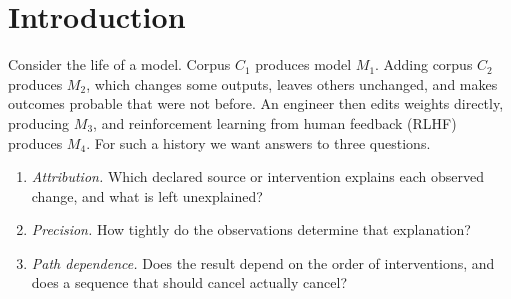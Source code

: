 \documentclass[11pt]{article}
\theoremstyle{definition}
\theoremstyle{remark}
\begin{document}
\begin{abstract}
1-cells differ. Their vertical composition is the gluing lemma and is strictly associative, but the
natural whiskerings are not functorial, and the strict 2-categorical structure is a graded metric
shadow. For several contexts, two compatible contexts always glue, and that gluing is vertical
composition of witnesses. For a general cover, the contextual fraction of Abramsky, Barbosa and
Mansfield equals our minimal unmodeled weight, and the best approximate global state is computed by a
linear program; for the Popescu--Rohrlich box it is exactly $1/4$ away from some context. Gluing at
the second level of the tower retains correlations that gluing flattened states loses. Finally, the
simplex of output distributions is a moment polytope whose Lagrangian fibres are what observation
forgets, and we state necessary conditions for a Fukaya-type realization. A synthetic four-stage
experiment produces a full provenance report. Every theorem is checked in exact arithmetic or with exactly verified linear
programming certificates.
\end{abstract}

\tableofcontents

\section{Introduction}\label{sec:intro}

Consider the life of a model. Corpus $C_1$ produces model $M_1$. Adding corpus $C_2$ produces $M_2$,
which changes some outputs, leaves others unchanged, and makes outcomes probable that were not before.
An engineer then edits weights directly, producing $M_3$, and reinforcement learning from human
feedback (RLHF) produces $M_4$. For such a history we want answers to three questions.

\begin{enumerate}[label=(Q\arabic*),leftmargin=*]
\item \emph{Attribution.} Which declared source or intervention explains each observed change, and
  what is left unexplained?
\item \emph{Precision.} How tightly do the observations determine that explanation?
\item \emph{Path dependence.} Does the result depend on the order of interventions, and does a
  sequence that should cancel actually cancel?
\end{enumerate}
\end{document}
